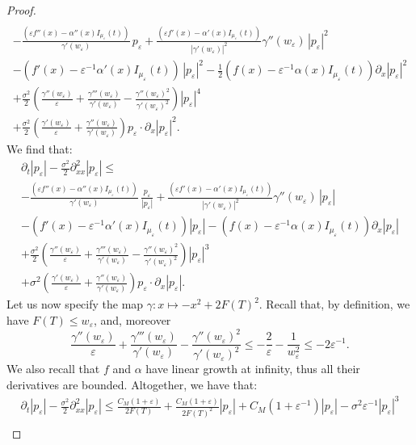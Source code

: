 \documentclass[10pt,a4paper]{amsart}
\newcommand{\eps}{\varepsilon}
\begin{document}
\begin{proof}
\begin{multline*}
\\
-\frac{\left(\eps f''(x) - \alpha''(x)I_{\mu_\eps}(t) \right)}{\gamma'(w_\eps)}\, p_\eps+\frac{\left(\eps f'(x) - \alpha'(x)I_{\mu_\eps}(t) \right)}{|\gamma'(w_\eps)|^2}\gamma''(w_\eps)\,|p_\eps|^2
\\
-  \left( f'(x)- \eps^{-1}\alpha'(x) I_{\mu_\eps}(t)\right)\,|p_\eps|^2-  \frac12\left( f(x)- \eps^{-1}\alpha(x) I_{\mu_\eps}(t)\right)\partial_x|p_\eps|^2
\\
 + \frac{\sigma^2}{2}\left(\frac{\gamma''(w_\eps)}{\eps}+\frac{\gamma'''(w_\eps)}{\gamma'(w_\eps)}-\frac{\gamma''(w_\eps)^2}{\gamma'(w_\eps)^2}\right) |p_\eps|^4
 \\ 
 + \frac{\sigma^2}{2}\left(\frac{\gamma'(w_\eps)}{\eps}+\frac{\gamma''(w_\eps)}{\gamma'(w_\eps)}\right) p_\eps \cdot\partial_x |p_\eps|^2.
\end{multline*}
We find that:
\begin{multline*}
\partial_t|p_\eps|-\frac{\sigma^2}{2}\partial^2_{xx}|p_\eps|
\leq 
\\
-\frac{\left(\eps f''(x) - \alpha''(x)I_{\mu_\eps}(t) \right)}{\gamma'(w_\eps)}\, \frac{p_\eps}{|p_\eps|}+\frac{\left(\eps f'(x) - \alpha'(x)I_{\mu_\eps}(t) \right)}{|\gamma'(w_\eps)|^2}\gamma''(w_\eps)\,|p_\eps|
\\
-  \left( f'(x)- \eps^{-1}\alpha'(x) I_{\mu_\eps}(t)\right)|p_\eps|-  \left( f(x)- \eps^{-1}\alpha(x) I_{\mu_\eps}(t)\right)\partial_x|p_\eps|
\\
 + \frac{\sigma^2}{2}\left(\frac{\gamma''(w_\eps)}{\eps}+\frac{\gamma'''(w_\eps)}{\gamma'(w_\eps)}-\frac{\gamma''(w_\eps)^2}{\gamma'(w_\eps)^2}\right) |p_\eps|^3
 \\ 
 + \sigma^2\left(\frac{\gamma'(w_\eps)}{\eps}+\frac{\gamma''(w_\eps)}{\gamma'(w_\eps)}\right) p_\eps \cdot\partial_x |p_\eps|.
\end{multline*}
Let us now specify the map $\gamma: x\mapsto - x^2+2F(T)^2$. Recall that, by definition, we have $F(T)\leq w_\eps$, and, moreover
$$
\frac{\gamma''(w_\eps)}{\eps}+\frac{\gamma'''(w_\eps)}{\gamma'(w_\eps)}-\frac{\gamma''(w_\eps)^2}{\gamma'(w_\eps)^2} \leq -\frac{2}{\eps}-\frac{1}{w_\eps^2}\leq -2\eps^{-1}.
$$
We also recall that $f$ and $\alpha$ have linear growth at infinity, thus all their derivatives are bounded. Altogether, we have that:
\begin{multline*}
\partial_t|p_\eps|-\frac{\sigma^2}{2}\partial^2_{xx}|p_\eps|
\leq \frac{C_M(1+\eps)}{2F(T)}+\frac{C_M(1+\eps)}{2F(T)^2}|p_\eps|
+C_M(1+\eps^{-1})|p_\eps|- \sigma^2\eps^{-1} |p_\eps|^3
\\

\end{multline*}
\end{proof}
\end{document}
